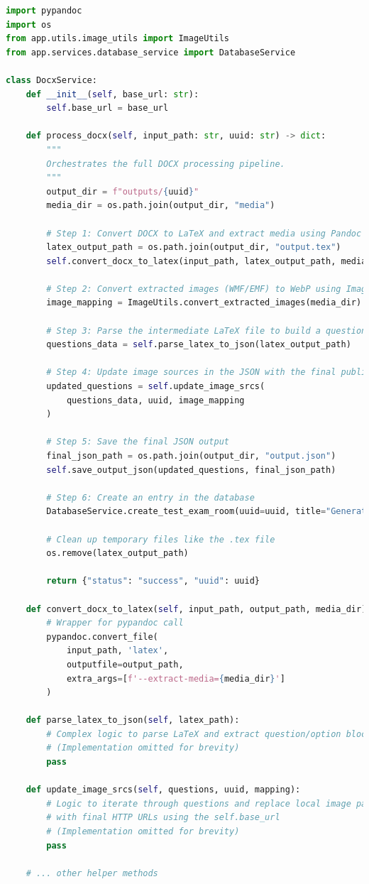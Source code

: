 \FloatBarrier
\begin{lstlisting}[language=Python, caption={Illustrative logic of the `DocxService` in the Python microservice.}, label={lst:docx-service-py}]
import pypandoc
import os
from app.utils.image_utils import ImageUtils
from app.services.database_service import DatabaseService

class DocxService:
    def __init__(self, base_url: str):
        self.base_url = base_url

    def process_docx(self, input_path: str, uuid: str) -> dict:
        """
        Orchestrates the full DOCX processing pipeline.
        """
        output_dir = f"outputs/{uuid}"
        media_dir = os.path.join(output_dir, "media")
        
        # Step 1: Convert DOCX to LaTeX and extract media using Pandoc
        latex_output_path = os.path.join(output_dir, "output.tex")
        self.convert_docx_to_latex(input_path, latex_output_path, media_dir)
        
        # Step 2: Convert extracted images (WMF/EMF) to WebP using ImageMagick
        image_mapping = ImageUtils.convert_extracted_images(media_dir)
        
        # Step 3: Parse the intermediate LaTeX file to build a question structure
        questions_data = self.parse_latex_to_json(latex_output_path)
        
        # Step 4: Update image sources in the JSON with the final public URLs
        updated_questions = self.update_image_srcs(
            questions_data, uuid, image_mapping
        )
        
        # Step 5: Save the final JSON output
        final_json_path = os.path.join(output_dir, "output.json")
        self.save_output_json(updated_questions, final_json_path)

        # Step 6: Create an entry in the database
        DatabaseService.create_test_exam_room(uuid=uuid, title="Generated from DOCX")

        # Clean up temporary files like the .tex file
        os.remove(latex_output_path)
        
        return {"status": "success", "uuid": uuid}

    def convert_docx_to_latex(self, input_path, output_path, media_dir):
        # Wrapper for pypandoc call
        pypandoc.convert_file(
            input_path, 'latex',
            outputfile=output_path,
            extra_args=[f'--extract-media={media_dir}']
        )

    def parse_latex_to_json(self, latex_path):
        # Complex logic to parse LaTeX and extract question/option blocks
        # (Implementation omitted for brevity)
        pass

    def update_image_srcs(self, questions, uuid, mapping):
        # Logic to iterate through questions and replace local image paths
        # with final HTTP URLs using the self.base_url
        # (Implementation omitted for brevity)
        pass
    
    # ... other helper methods
\end{lstlisting}
\FloatBarrier

